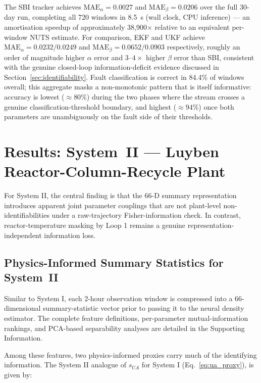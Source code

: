 \documentclass[aps,pre,twocolumn,superscriptaddress,floatfix]{revtex4-2}
\begin{document}
The SBI tracker achieves $\mathrm{MAE}_\alpha = 0.0027$ and
$\mathrm{MAE}_\beta = 0.0206$ over the full 30-day run, completing all 720
windows in 8.5~s (wall clock, CPU inference) --- an amortisation speedup of
approximately 38{,}900$\times$ relative to an equivalent per-window NUTS estimate.
For comparison, EKF and UKF achieve
$\mathrm{MAE}_\alpha = 0.0232/0.0249$ and $\mathrm{MAE}_\beta = 0.0652/0.0903$
respectively, roughly an order of magnitude higher $\alpha$ error and
$3$--$4\times$ higher $\beta$ error than SBI, consistent with the genuine
closed-loop information-deficit evidence discussed in
Section~\ref{sec:identifiability}.
Fault classification is correct in 84.4\% of windows overall; this aggregate masks a
non-monotonic pattern that is itself informative: accuracy is lowest ($\approx80\%$)
during the two phases where the stream crosses a genuine classification-threshold
boundary, and highest ($\approx94\%$) once both parameters are unambiguously on the
fault side of their thresholds.

\section{Results: System~II --- Luyben Reactor-Column-Recycle Plant}
\label{sec:results_system2}

For System II, the central finding is that the 66-D summary representation 
introduces apparent joint parameter couplings that are not plant-level non-
identifiabilities under a raw-trajectory Fisher-information check. In contrast, 
reactor-temperature masking by Loop 1 remains a genuine representation-independent 
information loss.

\subsection{Physics-Informed Summary Statistics for System~II}
\label{sec:wu_summary_stats}

Similar to System I, each 2-hour observation window is compressed into
a 66-dimensional summary-statistic vector prior to passing it to the neural
density estimator. The complete feature definitions, per-parameter 
mutual-information rankings, and PCA-based separability analyses are detailed
in the Supporting Information.

Among these features, two physics-informed proxies carry much of the identifying information. The System II analogue of $s_{U\!A}$ for System I (Eq.~\eqref{eq:ua_proxy}), is given by:
\end{document}
